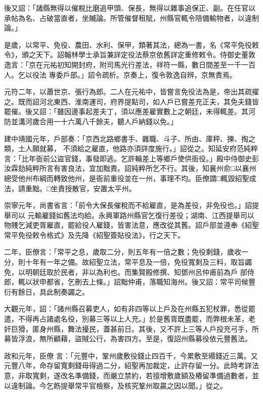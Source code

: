 \begin{pinyinscope}
 後又詔：「諸縣無得以催稅比磨追甲頭、保長，無得以雜事追保正、副。在任官以承帖為名、占破當直者，坐贓論。所管催督租賦，州縣官輒令陪備輸物者，以違制論。」



 是歲，以常平、免役、農田、水利、保甲，類著其法，總為一書，名《常平免役敕令》，頒之天下。詔翰林學士承旨兼詳定役法蔡京依舊詳定重修敕令。侍御史董敦逸言：「京在元祐初知開封府，附司馬光行差法，祥符一縣，數日間差至一千一百人。乞以役法
 專委戶部。」詔令疏析。京奏上，復令敦逸自辨，京無責焉。



 元符二年，以蕭世京、張行為郎。二人在元祐中，皆嘗言免役法為是，帝出其疏擢之。既而詔河北東西、淮南運司，府界提點司，如人戶已嘗差充正夫，其免夫錢皆罷催。後又詔：「雖因邊事起差夫丁，須以應差雇實數上之朝廷，未得輒差。其河防並溝河歲合用一十六萬八千餘夫，聽人戶納錢以免。」



 建中靖國元年，戶部奏：「京西北路鄉書手、雜職、斗子、所由、庫秤、揀、掏之類，土人願就募，
 不須給之雇直，他路亦須詳度施行。」詔從之。知延安府范純粹言：「比年衙前公盜官錢，事發即逃。乞許輪差上等鄉戶使供衙役。」殿中侍御史彭汝霖劾純粹所言有害良法，宜加黜責。詔純粹所乞不行。其後，知襄州俞□以襄州總受他州布綱而轉致他州，是衙前重役並在一州，事理不均。臣僚謂□輒毀紹聖成法，請重黜。□坐責授散官，安置太平州。



 崇寧元年，尚書省言：「前令大保長催稅而不給雇直，是為差役，非免役也。」詔提舉司以
 元輸雇錢如舊法均給。永興軍路州縣官乞復行差役；湖南、江西提舉司以物賤乞減吏胥雇直，罷給役人雇錢，皆害法意，應改從其舊。詔戶部並遵奉《紹聖常平免役敕令格式》及先降《紹聖簽貼役法》，行之天下。



 二年，臣僚言：「常平之息，歲取二分，則五年有一倍之數；免役剩錢，歲收一分，則十年有一年之備。故紹聖立法，常平息及一倍，免役寬剩及三料，取旨蠲免，以明朝廷取於民者，非以為利也。而集賢殿修撰、知鄧州呂仲甫前為戶
 部侍郎，輒以狀申都省，乞刪去上條。」詔黜仲甫，落職知海州。後又詔：常平司候豐衍有餘日，具此制奏蠲之。



 大觀元年，詔：「諸州縣召募吏人，如有非四等以上戶及在州縣五犯杖罪，悉從罷遣，不得再占諸處名役，別募三等以上人充。」於是舊胥既盡罷，而弊根未革，老奸巨猾，匿身州縣，舞法擾民，蓋甚前日。其後，又不許上三等人戶投充弓手，所募皆浮浪，無所顧藉，盜賊公行，為害四方。至是，復詔州縣募役依元豐舊法。



 政和元年，臣僚
 言：「元豐中，鞏州歲敷役錢止四百千，今累敷至緡錢近三萬。又元豐八年，命存留寬剩錢毋得過二分，紹聖再加裁定，止許存留一分。此時考詳法意，非取寬剩，遂改名準備錢，而嚴立禁約，若擅增敷歲額及樁留準備過數者，並以違制論。今乞飭提舉常平官檢察，及核究鞏州取贏之因以聞。」從之。




\end{pinyinscope}
